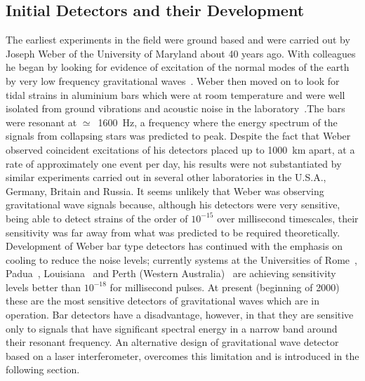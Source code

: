 \documentclass{article}
\begin{document}

\subsection{Initial Detectors and their Development}
\label{subsection:initdet}

The earliest experiments in the field were ground based and were carried out by
Joseph Weber of the University of Maryland about 40 years ago. With colleagues
he began by looking for evidence of excitation of the normal modes of the earth
by very low frequency gravitational waves~\cite{Forward2}. Weber then moved on
to look for tidal strains in aluminium bars which were at room temperature and
were well isolated from ground vibrations and acoustic noise in the
laboratory~\cite{Weber1, Weber2}.The bars were resonant at $\simeq$~1600~Hz, a
frequency where the energy spectrum of the signals from collapsing stars was
predicted to peak. Despite the fact that Weber observed coincident excitations
of his detectors placed up to 1000~km apart, at a rate of approximately one
event per day, his results were not substantiated by similar experiments carried
out in several other laboratories in the U.S.A., Germany, Britain and Russia. It
seems unlikely that Weber was observing gravitational wave signals because,
although his detectors were very sensitive, being able to detect strains of the
order of $10^{-15}$ over millisecond timescales, their sensitivity was far away
from what was predicted to be required theoretically. Development of Weber bar
type detectors has continued with the emphasis on cooling to reduce the noise
levels; currently systems at the Universities of Rome~\cite{Astone},
Padua~\cite{Prodi}, Louisiana~\cite{Amaldi} and Perth (Western
Australia)~\cite{Heng} are achieving sensitivity levels better than $10^{-18}$
for millisecond pulses. At present (beginning of 2000) these are the most
sensitive detectors of gravitational waves which are in operation. Bar detectors
have a disadvantage, however, in that they are sensitive only to signals that
have significant spectral energy in a narrow band around their resonant
frequency. An alternative design of gravitational wave detector based on a laser
interferometer, overcomes this limitation and is introduced in the following
section.



\end{document}
